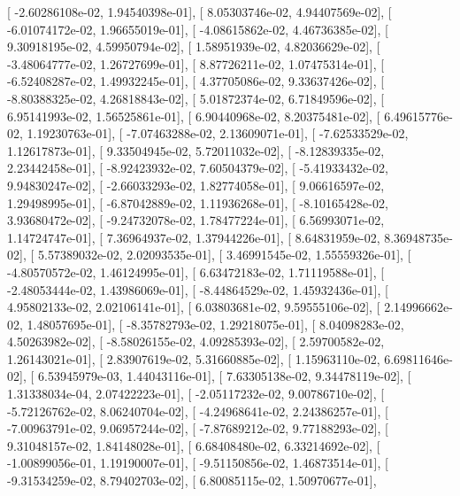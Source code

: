 \documentclass{article}
\begin{document}
       [ -2.60286108e-02,   1.94540398e-01],
       [  8.05303746e-02,   4.94407569e-02],
       [ -6.01074172e-02,   1.96655019e-01],
       [ -4.08615862e-02,   4.46736385e-02],
       [  9.30918195e-02,   4.59950794e-02],
       [  1.58951939e-02,   4.82036629e-02],
       [ -3.48064777e-02,   1.26727699e-01],
       [  8.87726211e-02,   1.07475314e-01],
       [ -6.52408287e-02,   1.49932245e-01],
       [  4.37705086e-02,   9.33637426e-02],
       [ -8.80388325e-02,   4.26818843e-02],
       [  5.01872374e-02,   6.71849596e-02],
       [  6.95141993e-02,   1.56525861e-01],
       [  6.90440968e-02,   8.20375481e-02],
       [  6.49615776e-02,   1.19230763e-01],
       [ -7.07463288e-02,   2.13609071e-01],
       [ -7.62533529e-02,   1.12617873e-01],
       [  9.33504945e-02,   5.72011032e-02],
       [ -8.12839335e-02,   2.23442458e-01],
       [ -8.92423932e-02,   7.60504379e-02],
       [ -5.41933432e-02,   9.94830247e-02],
       [ -2.66033293e-02,   1.82774058e-01],
       [  9.06616597e-02,   1.29498995e-01],
       [ -6.87042889e-02,   1.11936268e-01],
       [ -8.10165428e-02,   3.93680472e-02],
       [ -9.24732078e-02,   1.78477224e-01],
       [  6.56993071e-02,   1.14724747e-01],
       [  7.36964937e-02,   1.37944226e-01],
       [  8.64831959e-02,   8.36948735e-02],
       [  5.57389032e-02,   2.02093535e-01],
       [  3.46991545e-02,   1.55559326e-01],
       [ -4.80570572e-02,   1.46124995e-01],
       [  6.63472183e-02,   1.71119588e-01],
       [ -2.48053444e-02,   1.43986069e-01],
       [ -8.44864529e-02,   1.45932436e-01],
       [  4.95802133e-02,   2.02106141e-01],
       [  6.03803681e-02,   9.59555106e-02],
       [  2.14996662e-02,   1.48057695e-01],
       [ -8.35782793e-02,   1.29218075e-01],
       [  8.04098283e-02,   4.50263982e-02],
       [ -8.58026155e-02,   4.09285393e-02],
       [  2.59700582e-02,   1.26143021e-01],
       [  2.83907619e-02,   5.31660885e-02],
       [  1.15963110e-02,   6.69811646e-02],
       [  6.53945979e-03,   1.44043116e-01],
       [  7.63305138e-02,   9.34478119e-02],
       [  1.31338034e-04,   2.07422223e-01],
       [ -2.05117232e-02,   9.00786710e-02],
       [ -5.72126762e-02,   8.06240704e-02],
       [ -4.24968641e-02,   2.24386257e-01],
       [ -7.00963791e-02,   9.06957244e-02],
       [ -7.87689212e-02,   9.77188293e-02],
       [  9.31048157e-02,   1.84148028e-01],
       [  6.68408480e-02,   6.33214692e-02],
       [ -1.00899056e-01,   1.19190007e-01],
       [ -9.51150856e-02,   1.46873514e-01],
       [ -9.31534259e-02,   8.79402703e-02],
       [  6.80085115e-02,   1.50970677e-01],
\end{document}

